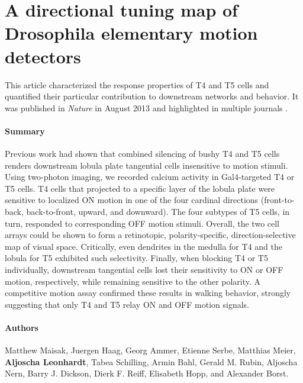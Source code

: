 \section{A directional tuning map of Drosophila elementary motion detectors}
\label{sct:manuscript_maisak}

This article characterized the response properties of T4 and T5 cells and quantified their particular contribution to downstream networks and behavior. It was published in \textit{Nature} in August 2013 \citep{Maisak:2013kk} and highlighted in multiple journals \citep{Masland:2013kv,Gilbert:2013aa,Yonehara:2013aa,Flight:2013aa}.

\paragraph{Summary}
Previous work had shown that combined silencing of bushy T4 and T5 cells renders downstream lobula plate tangential cells insensitive to motion stimuli. Using two-photon imaging, we recorded calcium activity in Gal4-targeted T4 or T5 cells. T4 cells that projected to a specific layer of the lobula plate were sensitive to localized ON motion in one of the four cardinal directions (front-to-back, back-to-front, upward, and downward). The four subtypes of T5 cells, in turn, responded to corresponding OFF motion stimuli. Overall, the two cell arrays could be shown to form a retinotopic, polarity-specific, direction-selective map of visual space. Critically, even dendrites in the medulla for T4 and the lobula for T5 exhibited such selectivity. Finally, when blocking T4 or T5 individually, downstream tangential cells lost their sensitivity to ON or OFF motion, respectively, while remaining sensitive to the other polarity. A competitive motion assay confirmed these results in walking behavior, strongly suggesting that only T4 and T5 relay ON and OFF motion signals.

\paragraph{Authors}
Matthew Maisak, Juergen Haag, Georg Ammer, Etienne Serbe, Matthias Meier, \textbf{Aljoscha Leonhardt}, Tabea Schilling, Armin Bahl, Gerald M. Rubin, Aljoscha Nern, Barry J. Dickson, Dierk F. Reiff, Elisabeth Hopp, and Alexander Borst.

